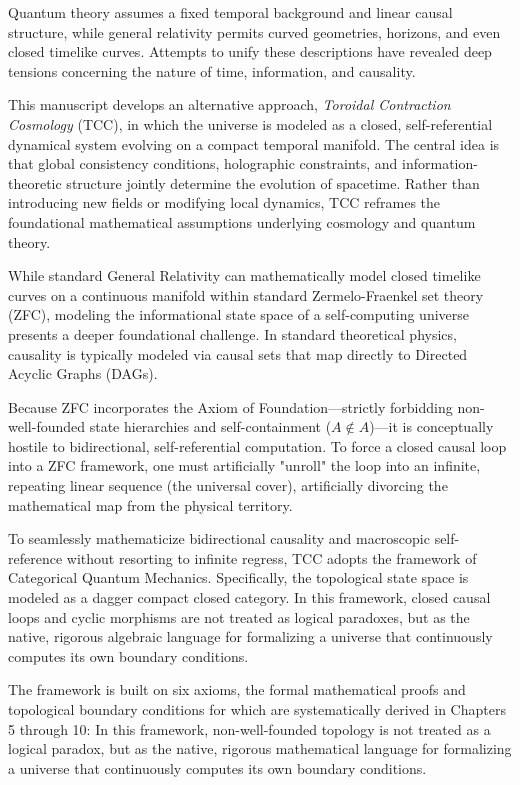 \documentclass[12pt,openany]{book}
\theoremstyle{plain}
\theoremstyle{definition}
\theoremstyle{remark}
\begin{document}
Quantum theory assumes a fixed temporal background and linear
causal structure, while general relativity permits curved geometries, horizons,
and even closed timelike curves. Attempts to unify these descriptions have
revealed deep tensions concerning the nature of time, information, and
causality.

This manuscript develops an alternative approach, \emph{Toroidal Contraction
Cosmology} (TCC), in which the universe is modeled as a closed, self-referential
dynamical system evolving on a compact temporal manifold. The central idea is
that global consistency conditions, holographic constraints, and
information-theoretic structure jointly determine the evolution of spacetime.
Rather than introducing new fields or modifying local dynamics, TCC reframes the
foundational mathematical assumptions underlying cosmology and quantum theory.

While standard General Relativity can mathematically model closed timelike curves on a continuous manifold within standard Zermelo-Fraenkel set theory (ZFC), modeling the informational state space of a self-computing universe presents a deeper foundational challenge. In standard theoretical physics, causality is typically modeled via causal sets that map directly to Directed Acyclic Graphs (DAGs). 

Because ZFC incorporates the Axiom of Foundation—strictly forbidding non-well-founded state hierarchies and self-containment ($A \notin A$)—it is conceptually hostile to bidirectional, self-referential computation. To force a closed causal loop into a ZFC framework, one must artificially "unroll" the loop into an infinite, repeating linear sequence (the universal cover), artificially divorcing the mathematical map from the physical territory. 

To seamlessly mathematicize bidirectional causality and macroscopic self-reference without resorting to infinite regress, TCC adopts the framework of Categorical Quantum Mechanics. Specifically, the topological state space is modeled as a dagger compact closed category. In this framework, closed causal loops and cyclic morphisms are not treated as logical paradoxes, but as the native, rigorous algebraic language for formalizing a universe that continuously computes its own boundary conditions.

The framework is built on six axioms, the formal mathematical proofs and topological boundary conditions for which are systematically derived in Chapters 5 through 10: In this framework, non-well-founded topology is not treated as a logical paradox, but as the native, rigorous mathematical language for formalizing a universe that continuously computes its own boundary conditions.
\end{document}

